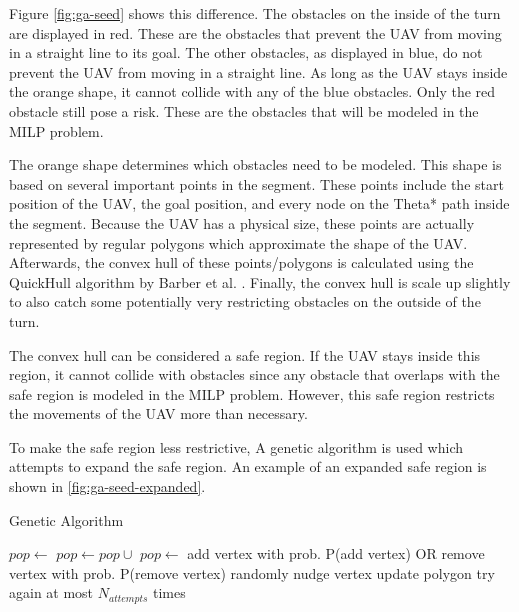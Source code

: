 Figure \ref{fig:ga-seed} shows this difference. The obstacles on the inside of the turn are displayed in red. These are the obstacles that prevent the UAV from moving in a straight line to its goal. The other obstacles, as displayed in blue, do not prevent the UAV from moving in a straight line. As long as the UAV stays inside the orange shape, it cannot collide with any of the blue obstacles. Only the red obstacle still pose a risk. These are the obstacles that will be modeled in the MILP problem.
\par
The orange shape determines which obstacles need to be modeled. This shape is based on several important points in the segment. These points include the start position of the UAV, the goal position, and every node on the Theta* path inside the segment. Because the UAV has a physical size, these points are actually represented by regular polygons which approximate the shape of the UAV. Afterwards, the convex hull of these points/polygons is calculated using the QuickHull algorithm by Barber et al. \cite{Barber1996}. Finally, the convex hull is scale up slightly to also catch some potentially very restricting obstacles on the outside of the turn.
\par
The convex hull can be considered a safe region. If the UAV stays inside this region, it cannot collide with obstacles since any obstacle that overlaps with the safe region is modeled in the MILP problem. However, this safe region restricts the movements of the UAV more than necessary.
\par
To make the safe region less restrictive, A genetic algorithm is used which attempts to expand the safe region. An example of an expanded safe region is shown in \ref{fig:ga-seed-expanded}.

\begin{algorithm}[h]
\caption{Genetic Algorithm}
\label{alg:ga}
\begin{algorithmic}[1]
\State $pop \leftarrow $ 
\State $pop \leftarrow pop \cup $ 
\State {}
\State $pop \leftarrow $ 
\EndFor
\Return {}
\EndFunction
{}
\State add vertex with prob. P(add vertex)
\State OR remove vertex with prob. P(remove vertex)
\State randomly nudge  vertex
\State update polygon
\Else
\State try again at most $N_{attempts}$ times
\EndIf
\EndFor
\EndFor
\Return {}
\EndFunction
\end{algorithmic}
\end{algorithm}

